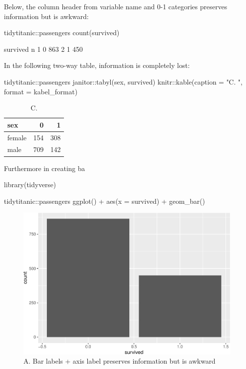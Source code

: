 Below, the column header from variable name and 0-1 categories preserves
information but is awkward:

\begin{Schunk}
\begin{Sinput}
tidytitanic::passengers %
  count(survived) 
\end{Sinput}
\begin{Soutput}
       survived   n
     1        0 863
     2        1 450
\end{Soutput}
\end{Schunk}

In the following two-way table, information is completely lost:

\begin{Schunk}
\begin{Sinput}
tidytitanic::passengers %
  janitor::tabyl(sex, survived) %
  knitr::kable(caption = "C. ", format = kabel_format)
\end{Sinput}
\begin{table}

\caption{\label{tab:unnamed-chunk-11}C. }
\centering
\begin{tabular}[t]{l|r|r}
\hline
sex & 0 & 1\\
\hline
female & 154 & 308\\
\hline
male & 709 & 142\\
\hline
\end{tabular}
\end{table}

\end{Schunk}

Furthermore in creating ba

\begin{Schunk}
\begin{Sinput}
library(tidyverse)

tidytitanic::passengers %
  ggplot() + 
  aes(x = survived) + 
  geom_bar()
\end{Sinput}
\begin{figure}
\includegraphics[width=0.69\linewidth]{r_journal_files/figure-latex/cars-1} \caption[A]{A. Bar labels + axis label preserves information but is awkward}\label{fig:cars}
\end{figure}
\end{Schunk}

